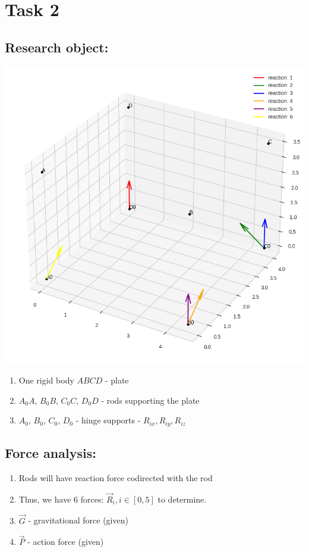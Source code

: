 \section{Task 2}

\subsection*{Research object:}

\includegraphics[width=\linewidth]{task2init.png}

\begin{enumerate}
    \item One rigid body $ABCD$ - plate
    \item $A_0A$, $B_0B$, $C_0C$, $D_0D$ - rods supporting the plate
    \item $A_0$, $B_0$, $C_0$, $D_0$ - hinge supports - $R_{ix}, R_{iy}, R_{iz}$
\end{enumerate}

\subsection*{Force analysis:}

\begin{enumerate}
    \item Rods will have reaction force codirected with the rod
    \item Thus, we have 6 forces: $\vec{R}_i, i \in [0, 5]$ to determine.
    \item $\vec{G}$ - gravitational force (given)
    \item $\vec{P}$ - action force (given)
\end{enumerate}

